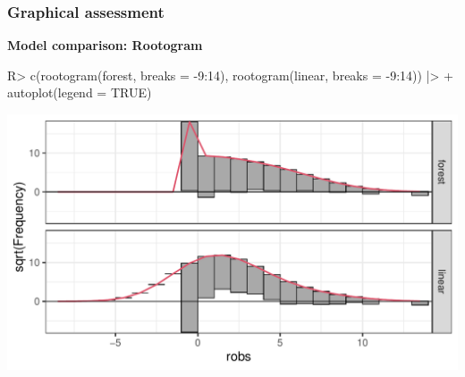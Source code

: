 \documentclass[11pt,t,usepdftitle=false,aspectratio=169]{beamer}
\begin{document}
\begin{frame}[fragile]
\addtocounter{framenumber}{-1}
\frametitle{Graphical assessment}

\vspace{-0.75em}

\textbf{Model comparison: Rootogram}

\vspace{0.5em}

\begin{Schunk}
\begin{Sinput}
R> c(rootogram(forest, breaks = -9:14), rootogram(linear, breaks = -9:14)) |>
+    autoplot(legend = TRUE)
\end{Sinput}
\end{Schunk}

\begin{center}
\includegraphics{slides-rain_topmodels_comp_rootogram}
\end{center}

\end{frame}
\end{document}
